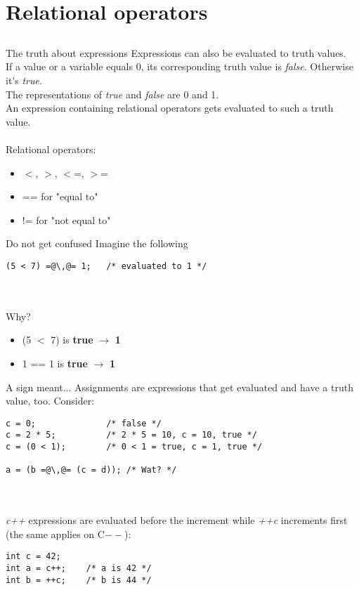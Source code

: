 \section{Relational operators}
\subsection{}
\begin{frame}{The truth about expressions}
	Expressions can also be evaluated to truth values.\\
	If a value or a variable equals 0, its corresponding truth value is \textit{false}. Otherwise it's \textit{true}.\\
	The representations of \textit{true} and \textit{false} are 0 and 1.\\
	An expression containing relational operators gets evaluated to such a truth value.\\
	\ \\Relational operators:
	\begin{itemize}
		\item $<$, $>$, $<$=, $>$=
		\item == for "equal to"
		\item != for "not equal to"
	\end{itemize}
\end{frame}
\begin{frame}[fragile]{Do not get confused}
	Imagine the following
	\begin{lstlisting}[numbers=none]
(5 < 7) =@\,@= 1;	/* evaluated to 1 */
\end{lstlisting}
\ \\\ \\Why?
\begin{itemize}
	\item<2-> (5 $<$ 7) is \textbf{true} $\rightarrow$ \textbf{1}
	\item<3-> 1 == 1 is \textbf{true} $\rightarrow$ \textbf{1}
\end{itemize}
\end{frame}
\begin{frame}[fragile]{A sign meant...}
	Assignments are expressions that get evaluated and have a truth value, too.
	Consider:
		\begin{lstlisting}[numbers=none]
c = 0;				/* false */
c = 2 * 5;			/* 2 * 5 = 10, c = 10, true */
c = (0 < 1);		/* 0 < 1 = true, c = 1, true */

a = (b =@\,@= (c = d));	/* Wat? */
\end{lstlisting}\ \\
	\ \\\textit{c++} expressions are evaluated before the increment while \textit{++c} increments first (the same applies on C$--$):
	\begin{lstlisting}[numbers=none]
int c = 42;
int a = c++;	/* a is 42 */
int b = ++c;	/* b is 44 */
\end{lstlisting}
\end{frame}
